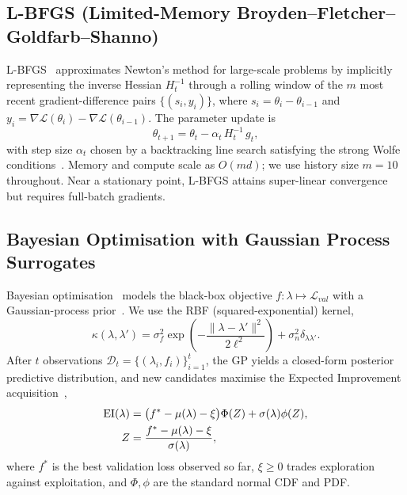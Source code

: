 \documentclass[11pt]{article}
\theoremstyle{definition}
\newcommand{\calL}{\mathcal{L}}
\newcommand{\calD}{\mathcal{D}}
\newcommand{\EI}{\mathrm{EI}}
\begin{document}
\subsection{L-BFGS (Limited-Memory Broyden--Fletcher--Goldfarb--Shanno)}

L-BFGS~\cite{liu1989lbfgs,byrd1995} approximates Newton's method for
large-scale problems by implicitly representing the inverse Hessian
$H_t^{-1}$ through a rolling window of the $m$ most recent
gradient-difference pairs $\{(s_i, y_i)\}$, where
$s_i = \theta_i - \theta_{i-1}$ and
$y_i = \nabla\mathcal{L}(\theta_i) - \nabla\mathcal{L}(\theta_{i-1})$.
The parameter update is
\begin{equation}
\theta_{t+1} = \theta_t - \alpha_t\,H_t^{-1}\,g_t,
\label{eq:lbfgs}
\end{equation}
with step size $\alpha_t$ chosen by a backtracking line search
satisfying the strong Wolfe conditions~\cite{wolfe1969}. Memory and
compute scale as $O(md)$; we use history size $m=10$ throughout.
Near a stationary point, L-BFGS attains super-linear convergence but
requires full-batch gradients.

\subsection{Bayesian Optimisation with Gaussian Process Surrogates}

Bayesian optimisation~\cite{snoek2012} models the black-box objective
$f:\lambda\mapsto\calL_{val}$ with a Gaussian-process
prior~\cite{rasmussen2006}. We use the RBF (squared-exponential)
kernel,
\begin{equation}
\kappa(\lambda,\lambda') = \sigma_f^2\exp\!\left(-\frac{\|\lambda-\lambda'\|^2}{2\ell^2}\right)
+\sigma_n^2\delta_{\lambda\lambda'}.
\label{eq:rbf}
\end{equation}
After $t$ observations $\calD_t = \{(\lambda_i, f_i)\}_{i=1}^t$, the
GP yields a closed-form posterior predictive distribution, and new
candidates maximise the Expected Improvement
acquisition~\cite{mockus1975},
\begin{align}
\EI(\lambda) &=
  \bigl(f^*-\mu(\lambda)-\xi\bigr)\Phi(Z)
  +\sigma(\lambda)\phi(Z),
\label{eq:ei}\\
Z &= \frac{f^*-\mu(\lambda)-\xi}{\sigma(\lambda)}, \notag
\end{align}
where $f^*$ is the best validation loss observed so far,
$\xi\ge 0$ trades exploration against exploitation, and $\Phi,\phi$
are the standard normal CDF and PDF.
\end{document}
